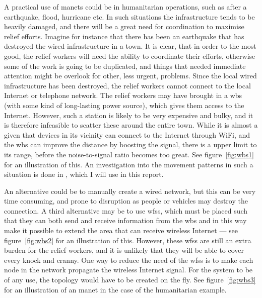 A practical use of \acp{manet} could be in humanitarian operations, such as after a earthquake, flood, hurricane etc. In such situations the infrastructure tends to be heavily damaged, and there will be a great need for coordination to maximise relief efforts. Imagine for instance that there has been an earthquake that has destroyed the wired infrastructure in a town. It is clear, that in order to the most good, the relief workers will need the ability to coordinate their efforts, otherwise some of the work is going to be duplicated, and things that needed immediate attention might be overlook for other, less urgent, problems. Since the local wired infrastructure has been destroyed, the relief workers cannot connect to the local Internet or telephone network. The relief workers may have brought in a \ac{wbs} (with some kind of long-lasting power source), which gives them access to the Internet. However, such a station is likely to be very expensive and bulky, and it is therefore infeasible to scatter these around the entire town. While it is almost a given that devices in its vicinity can connect to the Internet through WiFi, and the \ac{wbs} can improve the distance by boosting the signal, there is a upper limit to its range, before the noise-to-signal ratio becomes too great. See figure~\ref{fig:wbs1} for an illustration of this. An investigation into the movement patterns in such a situation is done in \cite{disasterArea}, which I will use in this report.


An alternative could be to manually create a wired network, but this can be very time consuming, and prone to disruption as people or vehicles may destroy the connection. A third alternative may be to use \acp{wfs}, which must be placed such that they can both send and receive information from the \ac{wbs} and in this way  make it possible to extend the area that can receive wireless Internet --- see  figure~\ref{fig:wbs2} for an illustration of this. However, these \acp{wfs} are still an extra burden for the relief workers, and it is unlikely that they will be able to cover every knock and cranny. One way to reduce the need of the \acp{wfs} is to make each node in the network propagate the wireless Internet signal. For the system to be of any use, the topology would have to be created on the fly. See figure~\ref{fig:wbs3} for an illustration of an \ac{manet} in the case of the humanitarian example.
 
